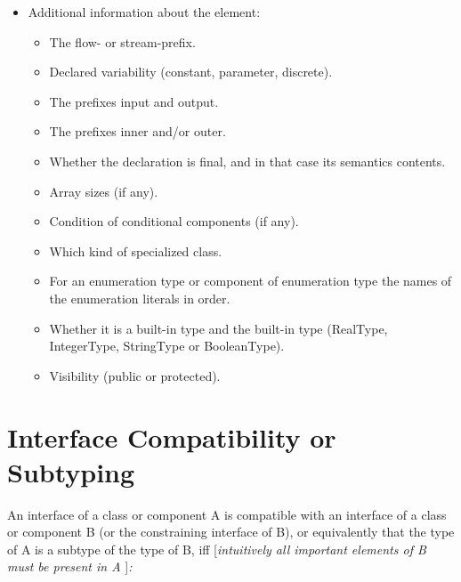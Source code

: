 \documentclass[10pt,a4paper]{report}
\def\doublelabel#1{\label{#1}\hypertarget{#1}{}}
\begin{document}
\begin{itemize}
\item
  Additional information about the element:

  \begin{itemize}
  \item
    The flow- or stream-prefix.
  \item
    Declared variability (constant, parameter, discrete).
  \item
    The prefixes input and output.
  \item
    The prefixes inner and/or outer.
  \item
    Whether the declaration is final, and in that case its semantics
    contents.
  \item
    Array sizes (if any).
  \item
    Condition of conditional components (if any).
  \item
    Which kind of specialized class.
  \item
    For an enumeration type or component of enumeration type the names
    of the enumeration literals in order.
  \item
    Whether it is a built-in type and the built-in type (RealType,
    IntegerType, StringType or BooleanType).
  \item
    Visibility (public or protected).
  \end{itemize}
\end{itemize}

\section{Interface Compatibility or Subtyping}\doublelabel{interface-compatibility-or-subtyping}

An interface of a class or component A is compatible with an interface
of a class or component B (or the constraining interface of B), or
equivalently that the type of A is a subtype of the type of B, iff
{[}\emph{intuitively all important elements of B must be present in A}
{]}\emph{:}
\end{document}
